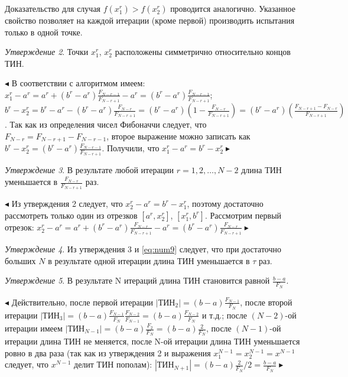 \documentclass[a4paper,12pt]{report}
\begin{document}
Доказательство для случая $f(x^{r}_{1}) > f(x^{r}_{2})$ проводится аналогично. Указанное свойство позволяет на каждой итерации (кроме первой) производить испытания только в одной точке.

\textit{Утверждение 2}. Точки $x^{r}_{1}$, $x^{r}_{2}$ расположены симметрично относительно концов ТИН.

$\blacktriangleleft$ В соответствии с алгоритмом имеем: $x^{r}_{1} - a^{r} = a^{r} + \left(b^{r} - a^{r}\right)\frac{F_{N-r-1}}{F_{N-r+1}} - a^{r} = \left(b^{r} - a^{r}\right)\frac{F_{N-r-1}}{F_{N-r+1}}$; $b^{r} - x^{r}_{2} = b^{r} - a^{r} - \left(b^{r} - a^{r}\right)\frac{F_{N-r}}{F_{N-r+1}} = \left(b^{r} - a^{r}\right)\left(1 - \frac{F_{N-r}}{F_{N-r+1}}\right) = \left(b^{r} - a^{r}\right)\left(\frac{F_{N-r+1} - F_{N-r}}{F_{N-r+1}}\right)$. Так как из определения чисел Фибоначчи следует, что $F_{N-r} = F_{N-r+1} - F_{N-r-1}$, второе выражение можно записать как $b^{r} - x^{r}_{2} = \left(b^{r} - a^{r}\right)\frac{F_{N-r-1}}{F_{N-r+1}}$. Получили, что $x^{r}_{1} - a^{r} = b^{r} - x^{r}_{2}  \blacktriangleright$

\textit{Утверждение 3}. В результате любой итерации $r = 1, 2, \ldots, N-2$ длина ТИН уменьшается в $\frac{F_{N-r}}{F_{N-r+1}}$ раз.

$\blacktriangleleft$ Из утверждения 2 следует, что $x^{r}_{2} - a^{r} = b^{r} - x^{r}_{1}$, поэтому достаточно рассмотреть только один из отрезков $\left[a^{r}, x^{r}_{2}\right]$, $\left[x^{r}_{1}, b^{r}\right]$. Рассмотрим первый отрезок: $x^{r}_{2} - a^{r} = a^{r} + \left(b^{r} - a^{r}\right)\frac{F_{N-r}}{F_{N-r+1}} - a^{r} = \left(b^{r} - a^{r}\right)\frac{F_{N-r}}{F_{N-r+1}} \blacktriangleright$

\textit{Утверждение 4}. Из утверждения 3 и \eqref{eq:num9} следует, что при достаточно больших $N$ в результате одной итерации длина ТИН уменьшается в $\tau$ раз.

\textit{Утверждение 5}. В результате N итераций длина ТИН становится равной $\frac{b-a}{F_{N}}$.

$\blacktriangleleft$ Действительно, после первой итерации $\left|\text{ТИН}_{2}\right| = \left(b-a\right)\frac{F_{N-1}}{F_{N}}$, после второй итерации $\left|\text{ТИН}_{3}\right| = \left(b-a\right)\frac{F_{N-1}}{F_{N}}\frac{F_{N-2}}{F_{N-1}} = \left(b-a\right)\frac{F_{N-2}}{F_{N}}$ и т.д.; после $\left(N-2\right)$-ой итерации имеем $\left|\text{ТИН}_{N-1}\right| = \left(b-a\right)\frac{F_{2}}{F_{N}} = \left(b-a\right)\frac{2}{F_{N}}$, после $\left(N-1\right)$-ой итерации длина ТИН не меняется, после N-ой итерации длина ТИН уменьшается ровно в два раза (так как из утверждения 2 и выражения  $x^{N-1}_{1} = x^{N-1}_{2} = x^{N-1}$ следует, что $x^{N-1}$ делит ТИН пополам): $\left|\text{ТИН}_{N+1}\right| = \left(b-a\right)\frac{2}{F_{N}} / 2 = \frac{b-a}{F_{N}} \blacktriangleright$
\end{document}
